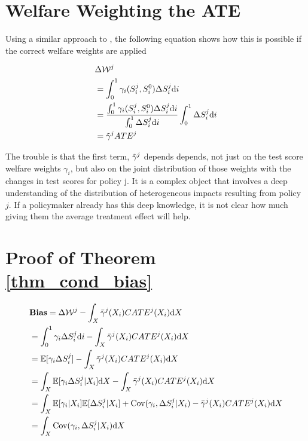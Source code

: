 \documentclass[12pt]{article}
\theoremstyle{definition}
\theoremstyle{definition}
\theoremstyle{definition}
\theoremstyle{definition}
\begin{document}
\pagebreak 
\section{Welfare Weighting the ATE}
\label{appendix_ww_ate}
    Using a similar approach to  \cite{Keyser_2020}, the following equation shows how this is possible if the correct welfare weights are applied


    \begin{align}
           & \Delta \mathcal{W}^j \\
           &  = \int_0^1 \gamma_i(S_i^j, S_i^0) \Delta S^j_i \text{d}i\\
           & = \frac{\int_0^1 \gamma_i(S_i^j, S_i^0) \Delta S^j_i \text{d}i}{\int_0^1 \Delta S^j_i \text{d}i} \int_0^1 \Delta S^j_i \text{d}i \\
           & =  \Tilde{\gamma}^j ATE^j 
    \end{align}

    The trouble is that the first term, $\Tilde{\gamma}^j$ depends depends, not just on the test score welfare weights $\gamma_i$, but also on the joint distribution of those weights with the changes in test scores for policy j. It is a complex object that involves a deep understanding of the distribution of heterogeneous impacts resulting from policy $j$. If a policymaker already has this deep knowledge, it is not clear how much giving them the average treatment effect will help.

\section{Proof of Theorem \ref{thm_cond_bias}}
\label{appendix_proof_th_cond}
        \begin{align*}
       & \textbf{Bias} = \Delta \mathcal{W}^j - \int_X \bar{\gamma}^j(X_i) CATE^j(X_i)\text{d}X  \\
       & =   \int_0^1 \gamma_i \Delta S^j_i \text{d}i - \int_X \bar{\gamma}^j(X_i) CATE^j(X_i) \text{d}X   \\
      & =  \mathbb{E}[\gamma_i \Delta S^j_i] - \int_X \bar{\gamma}^j(X_i) CATE^j(X_i) \text{d}X  \\
        & =  \int_X \mathbb{E}[\gamma_i \Delta S^j_i| X_i]\text{d}X - \int_X \bar{\gamma}^j(X_i) CATE^j(X_i)\text{d}X \\
       & = \int_X   \mathbb{E}[\gamma_i| X_i] \mathbb{E}[\Delta S^j_i| X_i] + \mathrm{Cov}(\gamma_i, \Delta S^j_i| X_i) - \bar{\gamma}^j(X_i) CATE^j(X_i)\text{d}X \\
       & = \int_X \mathrm{Cov}(\gamma_i, \Delta S^j_i| X_i)\text{d}X
    \end{align*}
\end{document}
